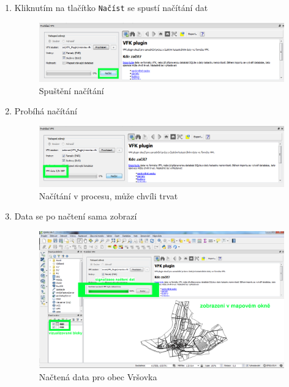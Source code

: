 \begin{enumerate}
  \item{Kliknutím na tlačítko \texttt{Načíst} se spustí načítání dat}
  \begin{figure}[H]
	 \centering
      \includegraphics[width=15cm]{./pictures/nacteni_4kr.png}
      \caption{Spuštění načítání}
      \label{fig:4kr_nacteni}
  \end{figure}
  
  \item{Probíhá načítání}
  \begin{figure}[H]
	 \centering
      \includegraphics[width=15cm]{./pictures/nacteni_5kr.png}
      \caption{Načítání v procesu, může chvíli trvat}
      \label{fig:5kr_nacteni}
  \end{figure}
  
   \item{Data se po načtení sama zobrazí}
  \begin{figure}[H]
	 \centering
      \includegraphics[width=15cm]{./pictures/nacteni_6kr.png}
      \caption{Načtená data pro obec Vršovka}
      \label{fig:6kr_nacteni}
  \end{figure}
 \end{enumerate}
 
